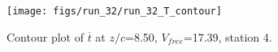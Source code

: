 \begin{figure}[H]
\centering
\texttt{[image: figs/run\_32/run\_32\_T\_contour]}
\caption{Contour plot of $\overline{t}$ at $z/c$=8.50, $V_{free}$=17.39, station 4.}
\label{fig:run_32_T_contour}
\end{figure}


